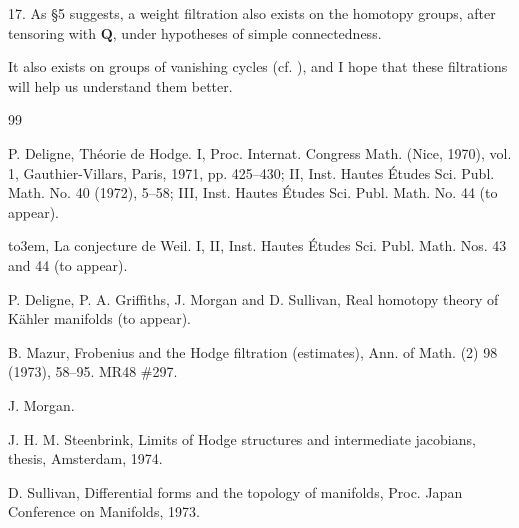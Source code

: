 \documentclass[10pt]{amsart}
\theoremstyle{plain}
\theoremstyle{definition}
\theoremstyle{remark}
\providecommand{\bysame}{\leavevmode\hbox to3em{\hrulefill}\thinspace}
\begin{document}
17. As \S 5 suggests, a weight filtration also exists on the homotopy groups, after tensoring with $\mathbf Q$, under hypotheses of simple connectedness.

It also exists on groups of vanishing cycles (cf. \cite{St}), and I hope that these filtrations will help us understand them better.

\begin{thebibliography}{99}

 P. Deligne, Théorie de Hodge. I, Proc. Internat. Congress Math. (Nice, 1970), vol. 1, Gauthier-Villars, Paris, 1971, pp. 425--430; II, Inst. Hautes Études Sci. Publ. Math. No. 40 (1972), 5--58; III, Inst. Hautes Études Sci. Publ. Math. No. 44 (to appear).

 \bysame, La conjecture de Weil. I, II, Inst. Hautes Études Sci. Publ. Math. Nos. 43 and 44 (to appear).

 P. Deligne, P. A. Griffiths, J. Morgan and D. Sullivan, Real homotopy theory of Kähler manifolds (to appear).

 B. Mazur, Frobenius and the Hodge filtration (estimates), Ann. of Math. (2) 98 (1973), 58--95. MR48 \#297.

 J. Morgan.

 J. H. M. Steenbrink, Limits of Hodge structures and intermediate jacobians, thesis, Amsterdam, 1974.

 D. Sullivan, Differential forms and the topology of manifolds, Proc. Japan Conference on Manifolds, 1973.

\end{thebibliography}
\end{document}
